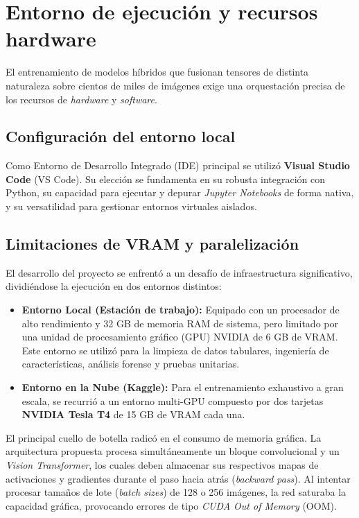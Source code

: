 \section{Entorno de ejecución y recursos hardware}

El entrenamiento de modelos híbridos que fusionan tensores de distinta naturaleza sobre cientos de miles de imágenes exige una orquestación precisa de los recursos de \textit{hardware} y \textit{software}.

\subsection{Configuración del entorno local}

Como Entorno de Desarrollo Integrado (IDE) principal se utilizó \textbf{Visual Studio Code} (VS Code). Su elección se fundamenta en su robusta integración con Python, su capacidad para ejecutar y depurar \textit{Jupyter Notebooks} de forma nativa, y su versatilidad para gestionar entornos virtuales aislados.

\subsection{Limitaciones de VRAM y paralelización}

El desarrollo del proyecto se enfrentó a un desafío de infraestructura significativo, dividiéndose la ejecución en dos entornos distintos:

\begin{itemize}
	\item \textbf{Entorno Local (Estación de trabajo):} Equipado con un procesador de alto rendimiento y 32 GB de memoria RAM de sistema, pero limitado por una unidad de procesamiento gráfico (GPU) NVIDIA de 6 GB de VRAM. Este entorno se utilizó para la limpieza de datos tabulares, ingeniería de características, análisis forense y pruebas unitarias.
	\item \textbf{Entorno en la Nube (Kaggle):} Para el entrenamiento exhaustivo a gran escala, se recurrió a un entorno multi-GPU compuesto por dos tarjetas \textbf{NVIDIA Tesla T4} de 15 GB de VRAM cada una.
\end{itemize}

El principal cuello de botella radicó en el consumo de memoria gráfica. La arquitectura propuesta procesa simultáneamente un bloque convolucional y un \textit{Vision Transformer}, los cuales deben almacenar sus respectivos mapas de activaciones y gradientes durante el paso hacia atrás (\textit{backward pass}). Al intentar procesar tamaños de lote (\textit{batch sizes}) de 128 o 256 imágenes, la red saturaba la capacidad gráfica, provocando errores de tipo \textit{CUDA Out of Memory} (OOM).

